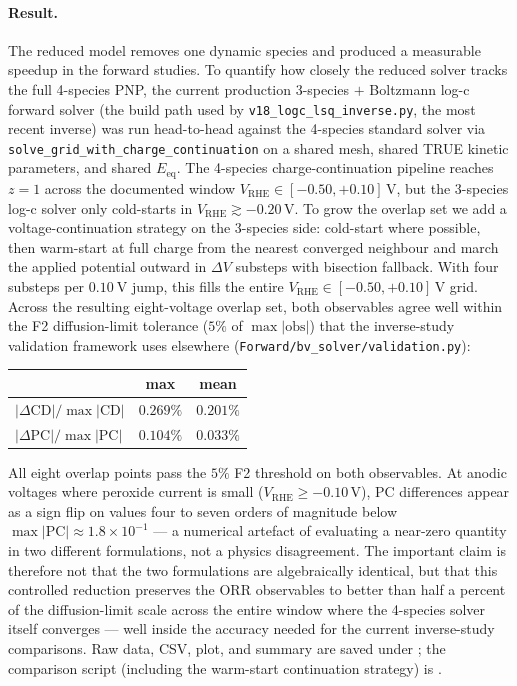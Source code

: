 \documentclass[11pt]{article}
\newcommand{\VRHE}{V_{\mathrm{RHE}}}
\begin{document}
\paragraph{Result.}
The reduced model removes one dynamic species and produced a measurable speedup
in the forward studies. To quantify how closely the reduced solver tracks
the full 4-species PNP, the current production 3-species $+$ Boltzmann log-c
forward solver (the build path used by \texttt{v18\_logc\_lsq\_inverse.py},
the most recent inverse) was run head-to-head against the 4-species standard
solver via \texttt{solve\_grid\_with\_charge\_continuation} on a shared mesh,
shared TRUE kinetic parameters, and shared $E_{\mathrm{eq}}$. The 4-species
charge-continuation pipeline reaches $z=1$ across the documented window
$\VRHE \in [-0.50, +0.10]$\,V, but the 3-species log-c solver only
cold-starts in $\VRHE \gtrsim -0.20$\,V. To grow the overlap set we add a
voltage-continuation strategy on the 3-species side: cold-start where
possible, then warm-start at full charge from the nearest converged
neighbour and march the applied potential outward in $\Delta V$ substeps
with bisection fallback. With four substeps per
$\SI{0.10}{\volt}$ jump, this fills the entire $\VRHE \in [-0.50, +0.10]$\,V
grid. Across the resulting eight-voltage overlap set, both observables
agree well within the F2 diffusion-limit tolerance ($5\%$ of
$\max|\text{obs}|$) that the inverse-study validation framework uses
elsewhere (\texttt{Forward/bv\_solver/validation.py}):
\begin{center}
  \begin{tabular}{lcc}
    \toprule
                                       & \textbf{max} & \textbf{mean} \\
    \midrule
    $|\Delta \mathrm{CD}| / \max|\mathrm{CD}|$ & $0.269\%$ & $0.201\%$ \\
    $|\Delta \mathrm{PC}| / \max|\mathrm{PC}|$ & $0.104\%$ & $0.033\%$ \\
    \bottomrule
  \end{tabular}
\end{center}
All eight overlap points pass the $5\%$ F2 threshold on both observables.
At anodic voltages where peroxide current is small ($\VRHE \ge -0.10$\,V),
PC differences appear as a sign flip on values four to seven orders of
magnitude below $\max|\mathrm{PC}|\approx 1.8\times 10^{-1}$ --- a numerical
artefact of evaluating a near-zero quantity in two different formulations,
not a physics disagreement. The important claim is therefore not that the
two formulations are algebraically identical, but that this controlled
reduction preserves the ORR observables to better than half a percent of
the diffusion-limit scale across the entire window where the 4-species
solver itself converges --- well inside the accuracy needed for the current
inverse-study comparisons. Raw data, CSV, plot, and summary are saved under
; the comparison script
(including the warm-start continuation strategy) is
.
\end{document}
